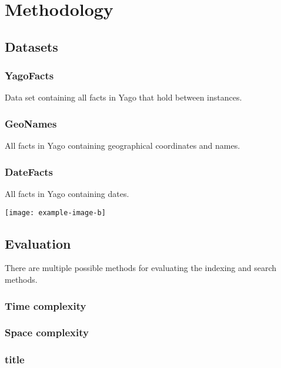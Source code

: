 
\chapter{Methodology}

\section{Datasets}
\subsection{YagoFacts}
Data set containing all facts in Yago that hold between instances.

\subsection{GeoNames}
All facts in Yago containing geographical coordinates and names.

\subsection{DateFacts}
All facts in Yago containing dates.

\texttt{[image: example-image-b]}

\section{Evaluation}
There are multiple possible methods for evaluating the indexing and search methods. 

\subsection{Time complexity}  

\subsection{Space complexity}

\subsection{title}

\cleardoublepage